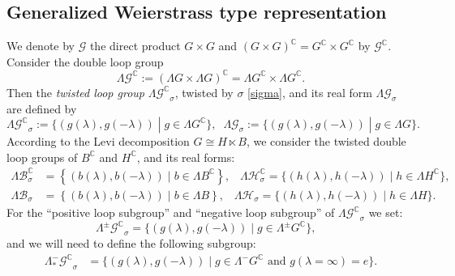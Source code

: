 \documentclass[12pt]{amsart}
\theoremstyle{definition}
\theoremstyle{remark}
\numberwithin{equation}{section}
\begin{document}
\subsection{Generalized Weierstrass type representation} 
 We denote by ${\mathcal G}$ the direct product $G \times G $ 
 and $(G \times G)^{\mathbb C} =G^{\mathbb C} \times G^{\mathbb C}$ by ${\mathcal G}^{\mathbb C}$.
 Consider the double loop group
\begin{equation*}
 {\Lambda {\mathcal G}^{\mathbb C}} := (\Lambda G \times \Lambda G)^{\mathbb C} = {\Lambda G^{\mathbb C}} \times {\Lambda G^{\mathbb C}}.
\end{equation*}
 Then the \textit{twisted loop group} ${\Lambda {\mathcal G}^{\mathbb C}}_{\sigma}$, twisted by $\sigma$
\eqref{sigma}, and its real form ${\Lambda {\mathcal G}}_{\sigma}$ are
 defined by
\begin{equation*}
 {\Lambda {\mathcal G}^{\mathbb C}}_{\sigma} := \{ (g({\lambda}), g(-{\lambda}))\;|\; g \in {\Lambda G^{\mathbb C}}\}, \;\;
 {\Lambda {\mathcal G}}_{\sigma} := \{ (g({\lambda}), g(-{\lambda}))\;|\; g \in {\Lambda G} \}.
\end{equation*}
 According to the Levi decomposition $G \cong H \ltimes B$, we consider the twisted 
 double loop groups of $B^{\mathbb C}$ and $H^{\mathbb C}$, and its real forms:
 \begin{align*}
  \Lambda {\mathcal B}^{\mathbb C}_{\sigma}  &= \left\{ (b({\lambda}), b(-{\lambda}))\; |\; b \in \Lambda B^{\mathbb C}\right\}, \;\;\;
 \Lambda \mathcal H^{\mathbb C}_{\sigma} = \{
 (h({\lambda}), h(-{\lambda})) \;|\; h \in \Lambda H^{\mathbb C}\}, \\
  \Lambda {\mathcal B}_{\sigma}  &= \left\{ (b({\lambda}), b(-{\lambda}))\; |\; b \in \Lambda B\right\}, \;\;\;
 \Lambda \mathcal H_{\sigma} = \{
 (h({\lambda}), h(-{\lambda})) \;|\; h \in \Lambda H\}.
 \end{align*}
 For the ``positive loop subgroup'' and ``negative loop subgroup'' 
 of ${\Lambda {\mathcal G}^{\mathbb C}}_{\sigma}$ we set:
\begin{equation*}
 {\Lambda^{\pm} {\mathcal G}^{\mathbb C}}_{\sigma} = \{(g({\lambda}), g(-{\lambda}))\;|\;g \in {\Lambda^{\pm} G^{\mathbb C}} \}, \;\;\;
\end{equation*}
 and we will need to define the following subgroup: 
\begin{align*}
{\Lambda^{-}_{*} {\mathcal G}^{\mathbb C}}_{\sigma}&=\{(g({\lambda}), g(-{\lambda})) \;|\; \mbox{$g \in {\Lambda^{-} G^{\mathbb C}}$ and
 $g({\lambda} = \infty) =e$}\}.
\end{align*}
\end{document}
